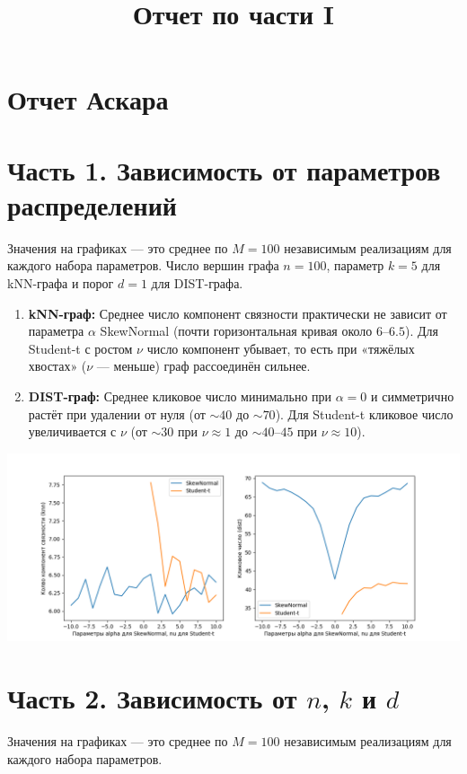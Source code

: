 \documentclass[12pt,a4paper]{article}
\title{Отчет по части I}
\date{}
\begin{document}
\maketitle

\section*{Отчет Аскара}
\section*{Часть 1. Зависимость от параметров распределений}
\vspace{-1em}
\noindent
Значения на графиках — это среднее по $M=100$ независимым реализациям для каждого набора параметров. Число вершин графа $n=100$, параметр $k=5$ для kNN-графа и порог $d=1$ для DIST-графа.

\begin{enumerate}
  \item \textbf{kNN-граф:} Среднее число компонент связности практически не зависит от параметра $\alpha$ SkewNormal (почти горизонтальная кривая около $6$–$6.5$). Для Student-t с ростом $\nu$ число компонент убывает, то есть при «тяжёлых хвостах» ($\nu$ — меньше) граф рассоединён сильнее.

  \item \textbf{DIST-граф:} Среднее кликовое число минимально при $\alpha=0$ и симметрично растёт при удалении от нуля (от $\sim40$ до $\sim70$). Для Student-t кликовое число увеличивается с $\nu$ (от $\sim30$ при $\nu\approx1$ до $\sim40$–$45$ при $\nu\approx10$).
\end{enumerate}

\begin{center}
  \includegraphics[width=0.9\linewidth]{part1_results_Askar.png}
\end{center}

\newpage
\section*{Часть 2. Зависимость от $n$, $k$ и $d$}
\vspace{-1em}
\noindent
Значения на графиках — это среднее по $M=100$ независимым реализациям для каждого набора параметров.
\end{document}

